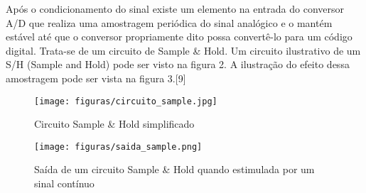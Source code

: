 Após o condicionamento do sinal existe um elemento na entrada do conversor A/D que realiza uma amostragem periódica do sinal analógico e o mantém estável até que o conversor propriamente dito possa convertê-lo para um código digital. Trata-se de um circuito de Sample \& Hold. Um circuito ilustrativo de um S/H (Sample and Hold) pode ser visto na figura 2. A ilustração do efeito dessa amostragem pode ser vista na figura 3\cite{braga2013}.[9]

\begin{figure}[H]
	\centering
	\texttt{[image: figuras/circuito\_sample.jpg]}
	\caption{Circuito Sample \& Hold simplificado} \label{circuito_sample}
\end{figure}

\begin{figure}[H]
	\centering
	\texttt{[image: figuras/saida\_sample.png]}
	\caption{Saída de um circuito Sample \& Hold quando estimulada por um sinal contínuo} \label{saida_sample}
\end{figure}

